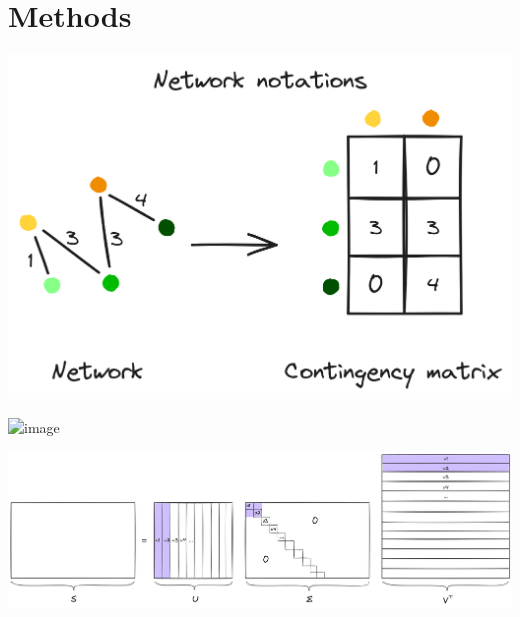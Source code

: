 \documentclass{beamer}
\begin{document}
\section{Methods}

\begin{frame}{}
  \centering
  \includegraphics[height=0.7\textheight, keepaspectratio]{figures_slides/netw_notation.png}%
\end{frame}

\begin{frame}{}
  \centering
  \includegraphics<1->[height=0.95\textheight, keepaspectratio]{figures_slides/Netw_generation.png}%
\end{frame}

\begin{frame}{}
  \centering
  \includegraphics[width=\linewidth, keepaspectratio]{figures_slides/SVD.png}%
\end{frame}
\end{document}
